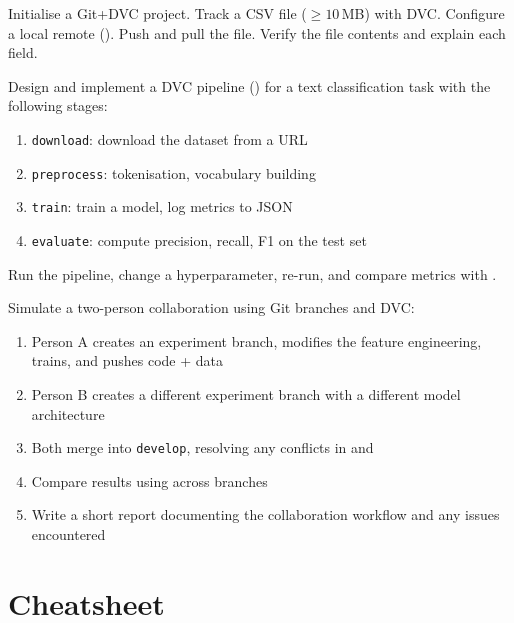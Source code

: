 \begin{exercise}
Initialise a Git+DVC project. Track a CSV file ($\ge 10$\,MB) with DVC.
Configure a local remote ().
Push and pull the file. Verify the  file contents and explain
each field.
\end{exercise}

\begin{exercise}
Design and implement a DVC pipeline () for a text
classification task with the following stages:
\begin{enumerate}
  \item \texttt{download}: download the dataset from a URL
  \item \texttt{preprocess}: tokenisation, vocabulary building
  \item \texttt{train}: train a model, log metrics to JSON
  \item \texttt{evaluate}: compute precision, recall, F1 on the test set
\end{enumerate}
Run the pipeline, change a hyperparameter, re-run, and compare metrics
with .
\end{exercise}

\begin{exercise}
Simulate a two-person collaboration using Git branches and DVC:
\begin{enumerate}
  \item Person A creates an experiment branch, modifies the feature
    engineering, trains, and pushes code + data
  \item Person B creates a different experiment branch with a different
    model architecture
  \item Both merge into \texttt{develop}, resolving any conflicts in
     and 
  \item Compare results using  across branches
  \item Write a short report documenting the collaboration workflow and
    any issues encountered
\end{enumerate}
\end{exercise}

\section{Cheatsheet}

